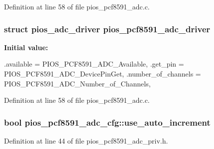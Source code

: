 \-Definition at line 58 of file pios\-\_\-pcf8591\-\_\-adc.\-c.

\hypertarget{group___p_i_o_s___p_c_f8591___a_d_c_ga5130c9fc21788de966e89cdda587e568}{
\subsubsection[{pios\-\_\-pcf8591\-\_\-adc\-\_\-driver}]{\setlength{\rightskip}{0pt plus 5cm}struct {\bf pios\-\_\-adc\-\_\-driver} {\bf pios\-\_\-pcf8591\-\_\-adc\-\_\-driver}}}\label{group___p_i_o_s___p_c_f8591___a_d_c_ga5130c9fc21788de966e89cdda587e568}
{\bfseries \-Initial value\-:}
\begin{DoxyCode}
 {
        .available = PIOS_PCF8591_ADC_Available,
        .get_pin = PIOS_PCF8591_ADC_DevicePinGet,
        .number_of_channels = PIOS_PCF8591_ADC_Number_of_Channels,
}
\end{DoxyCode}


\-Definition at line 58 of file pios\-\_\-pcf8591\-\_\-adc.\-c.

\hypertarget{group___p_i_o_s___p_c_f8591___a_d_c_ga20ee95c4cade76e7ad834f18e30d4123}{
\subsubsection[{use\-\_\-auto\-\_\-increment}]{\setlength{\rightskip}{0pt plus 5cm}bool {\bf pios\-\_\-pcf8591\-\_\-adc\-\_\-cfg\-::use\-\_\-auto\-\_\-increment}}}\label{group___p_i_o_s___p_c_f8591___a_d_c_ga20ee95c4cade76e7ad834f18e30d4123}


\-Definition at line 44 of file pios\-\_\-pcf8591\-\_\-adc\-\_\-priv.\-h.

